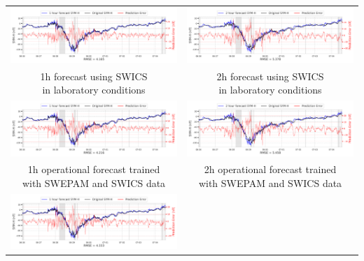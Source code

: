 \documentclass[draft,sw]{agutexSI2019}
\begin{document}
\begin{table}
\centering
\begin{tabular}{cc}
\includegraphics[width=0.49\linewidth]{paper_plots_shade/1h_swics/1h_swics_storm_40.png}
&
\includegraphics[width=0.49\linewidth]{paper_plots_shade/2h_swics/2h_swics_storm_40.png}
\\
\shortstack{1h forecast using SWICS\\ in laboratory conditions} & \shortstack{2h forecast using SWICS\\ in laboratory conditions}
\vspace*{12pt}
\\
\includegraphics[width=0.49\linewidth]{paper_plots_shade/1h_swics_rt/1h_swics_rt_storm_40.png}
&
\includegraphics[width=0.49\linewidth]{paper_plots_shade/2h_swics_rt/2h_swics_rt_storm_40.png}
\\
\shortstack{1h operational forecast trained\\ with SWEPAM and SWICS data} & \shortstack{2h operational forecast trained\\ with SWEPAM and SWICS data}
\vspace*{12pt}
\\
\includegraphics[width=0.49\linewidth]{paper_plots_shade/1h_swepam_rt/1h_swepam_rt_storm_40.png}

\end{tabular}
\end{table}
\end{document}
